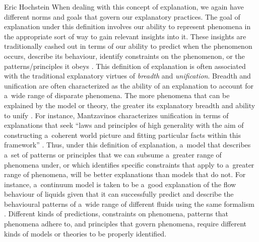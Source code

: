 \begin{artengenv}{Eric Hochstein}
When dealing with this concept of explanation, we again have different norms and goals that govern our explanatory practices. The goal of explanation under this definition involves our ability to represent phenomena in the appropriate sort of way to gain relevant insights into it. These insights are traditionally cashed out in terms of our ability to predict when the phenomenon occurs, describe its behaviour, identify constraints on the phenomenon, or the patterns/principles it obeys
\parencites[e.g.,][]{batterman_multiple_2000}{batterman_devil_2002}{batterman_minimal_2014}{chirimuuta_minimal_2014}. %
 This definition of explanation is often associated with the traditional explanatory virtues of \textit{breadth} and \textit{unification}. Breadth and unification are often characterized as the ability of an explanation to account for a~wide range of disparate phenomena. The more phenomena that can be explained by the model or theory, the greater its explanatory breadth and ability to unify 
\parencites[see,][]{mackonis_inference_2013}{lombrozo_explanatory_2016}{mantzavinos_explanatory_2016}. %
 For instance, Mantzavinos characterizes unification in terms of explanations that seek ``laws and principles of high generality with the aim of constructing a~coherent world picture and fitting particular facts within this framework'' 
\parencite[][p.6, footnote]{mantzavinos_explanatory_2016}. %
 Thus, under this definition of explanation, a~model that describes a~set of patterns or principles that we can subsume a~greater range of phenomena under, or which identifies specific constraints that apply to a~greater range of phenomena, will be better explanations than models that do not. For instance, a~continuum model is taken to be a~good explanation of the flow behaviour of liquids given that it can successfully predict and describe the behavioural patterns of a~wide range of different fluids using the same formalism 
\parencites[see,][]{batterman_minimal_2014}{izadi_building_2014}{bokulich_representing_2018}.
 Different kinds of predictions, constraints on phenomena, patterns that phenomena adhere to, and principles that govern phenomena, require different kinds of models or theories to be properly identified.


\end{artengenv}
